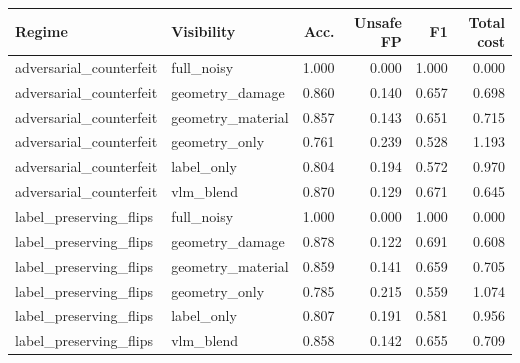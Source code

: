 \begin{tabular}{llrrrr}
\toprule
Regime & Visibility & Acc. & Unsafe FP & F1 & Total cost \\
\midrule
adversarial\_counterfeit & full\_noisy & 1.000 & 0.000 & 1.000 & 0.000 \\
adversarial\_counterfeit & geometry\_damage & 0.860 & 0.140 & 0.657 & 0.698 \\
adversarial\_counterfeit & geometry\_material & 0.857 & 0.143 & 0.651 & 0.715 \\
adversarial\_counterfeit & geometry\_only & 0.761 & 0.239 & 0.528 & 1.193 \\
adversarial\_counterfeit & label\_only & 0.804 & 0.194 & 0.572 & 0.970 \\
adversarial\_counterfeit & vlm\_blend & 0.870 & 0.129 & 0.671 & 0.645 \\
label\_preserving\_flips & full\_noisy & 1.000 & 0.000 & 1.000 & 0.000 \\
label\_preserving\_flips & geometry\_damage & 0.878 & 0.122 & 0.691 & 0.608 \\
label\_preserving\_flips & geometry\_material & 0.859 & 0.141 & 0.659 & 0.705 \\
label\_preserving\_flips & geometry\_only & 0.785 & 0.215 & 0.559 & 1.074 \\
label\_preserving\_flips & label\_only & 0.807 & 0.191 & 0.581 & 0.956 \\
label\_preserving\_flips & vlm\_blend & 0.858 & 0.142 & 0.655 & 0.709 \\
\bottomrule
\end{tabular}
